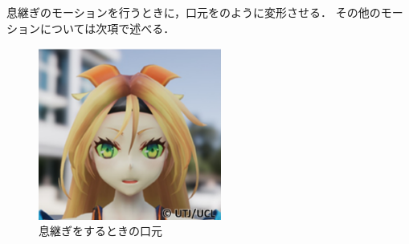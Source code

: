 息継ぎのモーションを行うときに，口元をのように変形させる．
その他のモーションについては次項で述べる．\\
\vspace{-2mm}
\begin{figure}[!h]
	\centering
	\includegraphics[width=6cm]{fig/chap3/breath.eps}
	\caption{息継ぎをするときの口元}
	\label{fig:breath_mouth}
\end{figure}
\newpage
